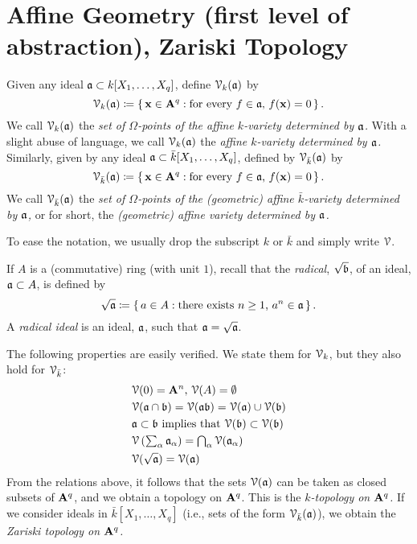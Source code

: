 \section{Affine Geometry (first level of abstraction), Zariski Topology}
\begin{definition}
Given any ideal $\mathfrak{a}\subset k[X_1,\dotsc,X_q]$, define $\mathcal{V}_k(\mathfrak{a})$
by
\[
\mathcal{V}_k(\mathfrak{a})\coloneqq\left\{\,\mathbf{x}\in\mathbf{A}^q:\text{for every
$f\in\mathfrak{a}$, $f(\mathbf{x})=0$}\,\right\}.
\]
We call $\mathcal{V}_k(\mathfrak{a})$ the \emph{set of $\Omega$-points of the affine
  $k$-variety determined by $\mathfrak{a}$.} With a slight abuse of language, we
call $\mathcal{V}_k(\mathfrak{a})$ the \emph{affine $k$-variety determined by $\mathfrak{a}$.}
Similarly, given by any ideal $\mathfrak{a}\subset\bar k[X_1,\dotsc,X_q]$,
defined by $\mathcal{V}_{\bar k}(\mathfrak{a})$ by
\[
\mathcal{V}_{\bar k}(\mathfrak{a})\coloneqq\left\{\,\mathbf{x}\in \mathbf{A}^q:
\text{for every $f\in\mathfrak{a}$, $f(\mathbf{x})=0$}\,\right\}.
\]
We call $\mathcal{V}_{\bar k}(\mathfrak{a})$ the \emph{set of $\Omega$-points of the
  (geometric) affine $\bar k$-variety determined by $\mathfrak{a}$,} or for
short, the \emph{(geometric) affine variety determined by $\mathfrak{a}$.}
\end{definition}

To ease the notation, we usually drop the subscript $k$ or $\bar k$ and
simply write $\mathcal{V}$.

If $A$ is a (commutative) ring (with unit $1$), recall that the
\emph{radical}, $\sqrt{\mathfrak{b}}$, of an ideal, $\mathfrak{a}\subset A$, is defined
by
\[
\sqrt{\mathfrak{a}}\coloneqq\left\{\,a\in A:\text{there exists $n\geq 1$,
    $a^n\in\mathfrak{a}$}\,\right\}.
\]
A \emph{radical ideal} is an ideal, $\mathfrak{a}$, such that
$\mathfrak{a}=\sqrt{\mathfrak{a}}$.

The following properties are easily verified. We state them for $\mathcal{V}_k$, but
they also hold for $\mathcal{V}_{\bar k}$:
\begin{align*}
&\text{$\mathcal{V}(0)=\mathbf{A}^n$, $\mathcal{V}(A)=\emptyset$}\\
&\mathcal{V}(\mathfrak{a}\cap\mathfrak{b})=\mathcal{V}(\mathfrak{a}\mathfrak{b})=\mathcal{V}(\mathfrak{a})\cup\mathcal{V}(\mathfrak{b})\\
&\text{$\mathfrak{a}\subset\mathfrak{b}$ implies that $\mathcal{V}(\mathfrak{b})\subset\mathcal{V}(\mathfrak{b})$}\\
&\mathcal{V}\left({\textstyle\sum_\alpha\mathfrak{a}_\alpha}\right)
={\textstyle \bigcap_\alpha\mathcal{V}(\mathfrak{a}_\alpha)}\\
&\mathcal{V}(\sqrt{\mathfrak{a}})=\mathcal{V}(\mathfrak{a})
\end{align*}
From the relations above, it follows that the sets $\mathcal{V}(\mathfrak{a})$ can be taken
as closed subsets of $\mathbf{A}^q$, and we obtain a topology on $\mathbf{A}^q$. This
is the \emph{$k$-topology on $\mathbf{A}^q$.} If we consider ideals in $\bar
k[X_1,\dotsc,X_q]$ (i.e., sets of the form $\mathcal{V}_{\bar k}(\mathfrak{a})$), we obtain
the \emph{Zariski topology on $\mathbf{A}^q$.}

